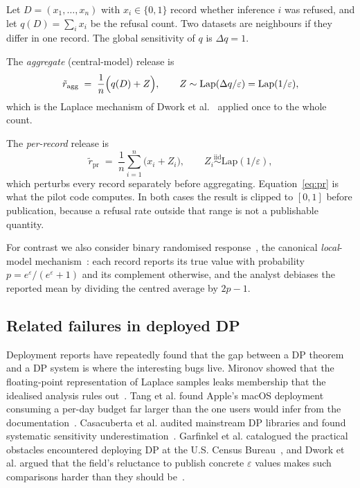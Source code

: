 \documentclass[journal]{IEEEtran}
\theoremstyle{definition}
\begin{document}
Let $D = (x_1,\dots,x_n)$ with $x_i \in \{0,1\}$ record whether inference $i$ was
refused, and let $q(D) = \sum_i x_i$ be the refusal count. Two datasets are
neighbours if they differ in one record. The global sensitivity of $q$ is
$\Delta q = 1$.

The \emph{aggregate} (central-model) release is
\begin{equation}
\tilde{r}_{\mathrm{agg}} \;=\; \frac{1}{n}\Bigl(q(D) + Z\Bigr),
\qquad Z \sim \mathrm{Lap}(\Delta q/\varepsilon) = \mathrm{Lap}(1/\varepsilon),
\label{eq:agg}
\end{equation}
which is the Laplace mechanism of Dwork et al.~\cite{dwork2006calibrating}
applied once to the whole count.

The \emph{per-record} release is
\begin{equation}
\tilde{r}_{\mathrm{pr}} \;=\; \frac{1}{n}\sum_{i=1}^{n}\bigl(x_i + Z_i\bigr),
\qquad Z_i \stackrel{\text{iid}}{\sim} \mathrm{Lap}(1/\varepsilon),
\label{eq:pr}
\end{equation}
which perturbs every record separately before aggregating. Equation~\eqref{eq:pr}
is what the pilot code computes. In both cases the result is clipped to $[0,1]$
before publication, because a refusal rate outside that range is not a
publishable quantity.

For contrast we also consider binary randomised response~\cite{warner1965rr}, the
canonical \emph{local}-model mechanism~\cite{kasiviswanathan2011learn,
erlingsson2014rappor}: each record reports its true value with probability
$p = e^{\varepsilon}/(e^{\varepsilon}+1)$ and its complement otherwise, and the
analyst debiases the reported mean by dividing the centred average by $2p-1$.

\subsection{Related failures in deployed DP}

Deployment reports have repeatedly found that the gap between a DP theorem and a
DP system is where the interesting bugs live. Mironov showed that the
floating-point representation of Laplace samples leaks membership that the
idealised analysis rules out~\cite{mironov2012lsb}. Tang et al. found Apple's
macOS deployment consuming a per-day budget far larger than the one users would
infer from the documentation~\cite{tang2017apple}. Casacuberta et al. audited
mainstream DP libraries and found systematic sensitivity
underestimation~\cite{casacuberta2022sensitivity}. Garfinkel et al. catalogued
the practical obstacles encountered deploying DP at the U.S. Census
Bureau~\cite{garfinkel2018issues}, and Dwork et al. argued that the field's
reluctance to publish concrete $\varepsilon$ values makes such comparisons
harder than they should be~\cite{dwork2019epsilons}.
\end{document}
